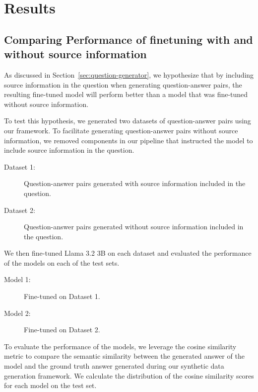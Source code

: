 \section{Results}\label{sec:results}

\subsection{Comparing Performance of finetuning with and without source information}\label{sec:source-results}


As discussed in Section~\ref{sec:question-generator}, we hypothesize that by including source information
in the question when generating question-answer pairs, the resulting fine-tuned model will perform
better than a model that was fine-tuned without source information.

To test this hypothesis, we generated two datasets of question-answer pairs using our framework.
To facilitate generating question-answer pairs without source information, we removed components in our pipeline
that instructed the model to include source information in the question.
\begin{description}
    \item[Dataset 1:] Question-answer pairs generated with source information included in the question.
    \item[Dataset 2:] Question-answer pairs generated without source information included in the question.
\end{description}

We then fine-tuned Llama 3.2 3B on each dataset and evaluated the performance of the models on each of the
test sets.
\begin{description}
    \item[Model 1:] Fine-tuned on Dataset 1.
    \item[Model 2:] Fine-tuned on Dataset 2.
\end{description}

To evaluate the performance of the models, we leverage the cosine similarity metric to compare the semantic similarity
between the generated answer of the model and the ground truth answer generated during our synthetic data generation framework.
We calculate the distribution of the cosine similarity scores for each model on the test set.


